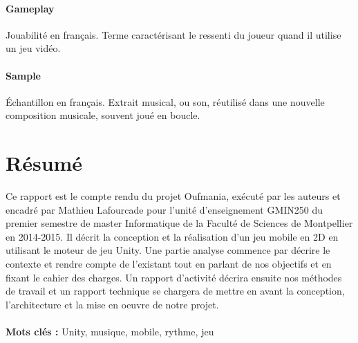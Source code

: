 \documentclass [a4 paper,11pt]{report}
\begin{document}
\paragraph{Gameplay} Jouabilité en français. Terme caractérisant le ressenti du joueur quand il utilise un jeu vidéo.

\paragraph{Sample} Échantillon en français. Extrait musical, ou son, réutilisé dans une nouvelle composition musicale, souvent joué en boucle.

\paragraph{}



\newpage




\newpage



\newpage



\newpage



\newpage



\newpage



\newpage
\pagestyle{empty}
\section*{Résumé}
Ce rapport est le compte rendu du projet Oufmania, exécuté par les auteurs et encadré par Mathieu Lafourcade pour l'unité d'enseignement GMIN250 du premier semestre de master Informatique de la Faculté de Sciences de Montpellier en 2014-2015. Il décrit la conception et la réalisation d'un jeu mobile en 2D en utilisant le moteur de jeu Unity. Une partie analyse commence par décrire le contexte et rendre compte de l'existant tout en parlant de nos objectifs et en fixant le cahier des charges. Un rapport d'activité décrira ensuite nos méthodes de travail et un rapport technique se chargera de mettre en avant la conception, l'architecture et la mise en oeuvre de notre projet.
\\\\
\textbf{Mots clés : } Unity, musique, mobile, rythme, jeu
\end{document}
